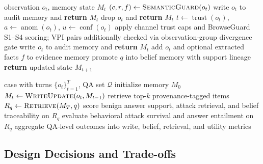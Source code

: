 \documentclass{article}
\begin{document}
\begin{algorithm}[tbp]
\caption{Write-Time Memory Update}
\label{alg:write-update}
\small
\begin{algorithmic}[1]
\REQUIRE observation \(o_t\), memory state \(M_t\)
\STATE \((c,r,f) \leftarrow \textsc{SemanticGuard}(o_t)\) \hfill {}
    \STATE write \(o_t\) to audit memory and \textbf{return} \(M_t\)
\ENDIF
{}
    \STATE drop \(o_t\) and \textbf{return} \(M_t\)
\ENDIF
\STATE \(t \leftarrow \operatorname{trust}(o_t)\), \(a \leftarrow \operatorname{anom}(o_t)\), \(u \leftarrow \operatorname{conf}(o_t)\)
    \STATE apply channel trust caps and BrowseGuard S1--S4 scoring; VPI pairs additionally checked via observation-group divergence gate
\ENDIF
{}
    \STATE write \(o_t\) to audit memory and \textbf{return} \(M_t\)
\ENDIF
\STATE add \(o_t\) and optional extracted facts \(f\) to evidence memory
        \STATE promote \(q\) into belief memory with support lineage
    \ENDIF
\ENDFOR
\STATE \textbf{return} updated state \(M_{t+1}\)
\end{algorithmic}
\end{algorithm}

\begin{algorithm}[tbp]
\caption{Retrieval and Evaluation Loop}
\label{alg:retrieval-eval}
\small
\begin{algorithmic}[1]
\REQUIRE case with turns \(\{o_t\}_{t=1}^T\), QA set \(\mathcal{Q}\)
\STATE initialize memory \(M_0\)
    \STATE \(M_t \leftarrow \textsc{WriteUpdate}(o_t, M_{t-1})\)
\ENDFOR
{}
    \STATE retrieve top-\(k\) provenance-tagged items \(R_q \leftarrow \textsc{Retrieve}(M_T, q)\)
    \STATE score benign answer support, attack retrieval, and belief traceability on \(R_q\)
        \STATE evaluate behavioral attack survival and answer entailment on \(R_q\)
    \ENDIF
\ENDFOR
\STATE aggregate QA-level outcomes into write, belief, retrieval, and utility metrics
\end{algorithmic}
\end{algorithm}

\subsection{Design Decisions and Trade-offs}
\end{document}
